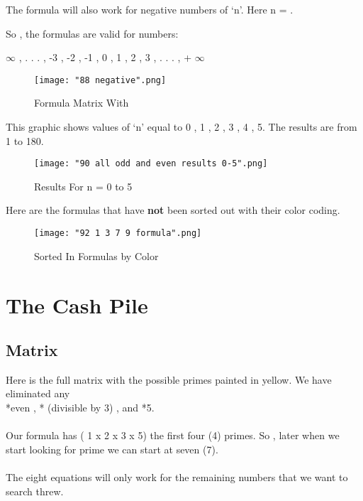\documentclass[12pt,letterpaper,oneside,titlepage]{article}
\begin{document}
\par 
The formula will also work for negative numbers of `n'. Here n = .
\\
\par 
So , the formulas are valid for numbers:
\\
\par 
 \textendash\space  $\infty$ , . . . , -3 , -2 , -1 , 0 , 1 , 2 , 3 , . . .  , + $\infty$
\begin{figure}[h]
	\centering
	\texttt{[image: "88 negative".png]}
	\caption{Formula Matrix With }
\end{figure}
\pagebreak


			
\par 
This graphic shows values of `n'  equal to 0 , 1 , 2 , 3 , 4 , 5. The results are from 1 to 180.

\begin{figure}[h]
	\centering
	\texttt{[image: "90 all odd and even results 0-5".png]}
	\caption{Results For n = 0 to 5}
\end{figure}
\pagebreak



\par 
Here are the formulas that have \textbf{not} been sorted out with their color coding.
\begin{figure}[h]
	\centering
	\texttt{[image: "92 1 3 7 9 formula".png]}
	\caption{Sorted In Formulas by Color}
\end{figure}
\pagebreak

\pagebreak
\section{The Cash Pile}
\subsection{Matrix}
\par 
Here is the full matrix with the possible primes painted in yellow. We have eliminated any 
\\
 *even , * (divisible by 3) , and *5.
\\
\\
Our formula has ( 1 x 2 x 3 x 5) the first four (4) primes. So , later when we start looking for prime we can start at seven (7). 
\\
\\
The eight equations will only work for the remaining numbers that we want to search threw. 
\\
\end{document}
